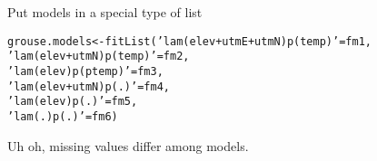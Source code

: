 \documentclass[color=usenames,dvipsnames]{beamer}\usepackage[]{graphicx}\usepackage[]{color}
\makeatletter
\newcommand{\hlstr}[1]{\textcolor[rgb]{0.749,0.012,0.012}{#1}}%
\newcommand{\hlstd}[1]{\textcolor[rgb]{0,0,0}{#1}}%
\newcommand{\hlkwb}[1]{\textcolor[rgb]{0,0.341,0.682}{#1}}%
\newcommand{\hlkwd}[1]{\textcolor[rgb]{0.004,0.004,0.506}{#1}}%
\newenvironment{kframe}{%
 \def\at@end@of@kframe{}%
 \ifinner\ifhmode%
  \def\at@end@of@kframe{\end{minipage}}%
  \begin{minipage}{\columnwidth}%
 \fi\fi%
 \def\FrameCommand##1{\hskip\@totalleftmargin \hskip-\fboxsep
 \colorbox{shadecolor}{##1}\hskip-\fboxsep
     \hskip-\linewidth \hskip-\@totalleftmargin \hskip\columnwidth}%
 \MakeFramed {\advance\hsize-\width
   \@totalleftmargin\z@ \linewidth\hsize
   \@setminipage}}%
 {\par\unskip\endMakeFramed%
 \at@end@of@kframe}
\newenvironment{knitrout}{}{} %
\makeatother
\begin{document}
\begin{frame}[fragile]
\begin{knitrout}
\begin{kframe}
{\ttfamily\noindent\bfseries{}}\end{kframe}
\end{knitrout}
\pause
\vfill
Put models in a special type of list
  \vspace{-6pt}
\begin{knitrout}\footnotesize
{}\color{fgcolor}\begin{kframe}
\begin{alltt}
\hlstd{grouse.models} \hlkwb{<-} \hlkwd{fitList}\hlstd{(}\hlstr{'lam(elev+utmE+utmN)p(temp)'}\hlstd{=fm1,}
                         \hlstr{'lam(elev+utmN)p(temp)'}\hlstd{=fm2,}
                         \hlstr{'lam(elev)p(ptemp)'}\hlstd{=fm3,}
                         \hlstr{'lam(elev+utmN)p(.)'}\hlstd{=fm4,}
                         \hlstr{'lam(elev)p(.)'}\hlstd{=fm5,}
                         \hlstr{'lam(.)p(.)'}\hlstd{=fm6)}
\end{alltt}
\end{kframe}
\end{knitrout}
\pause
Uh oh, missing values differ among models.
\end{frame}
\end{document}
